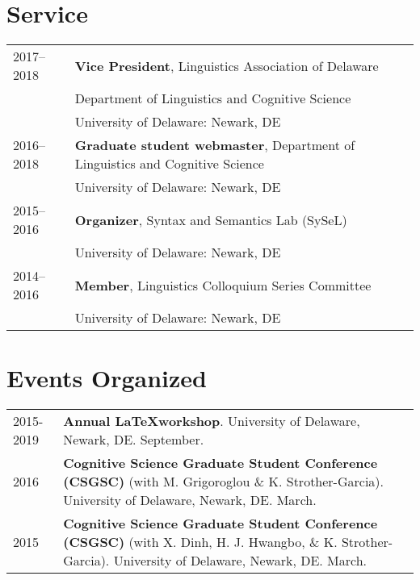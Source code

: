 \documentclass[11pt]{article} %
\begin{document}

\section*{Service}

\begin{longtable}{p{1in} p{5.3in}}
	2017--2018 & \textbf{Vice President}, Linguistics Association of Delaware \\
	& Department of Linguistics and Cognitive Science \\ 
	& University of Delaware: Newark, DE \\[5pt]
2016--2018 & \textbf{Graduate student webmaster}, Department of Linguistics and Cognitive Science \\ 
 & University of Delaware: Newark, DE \\[5pt]
2015--2016 & \textbf{Organizer}, Syntax and Semantics Lab (SySeL) \\
& University of Delaware: Newark, DE \\ [5pt]
2014--2016 & \textbf{Member}, Linguistics Colloquium Series Committee \\
& University of Delaware: Newark, DE \\ 
\end{longtable}

\section*{Events Organized}
\begin{longtable}{p{1in} p{5.3in}}
	2015-2019 & \textbf{Annual \LaTeX workshop}. University of Delaware, Newark, DE. September. \\ [5pt]
2016 &   \textbf{Cognitive Science Graduate Student Conference (CSGSC)} (with M. Grigoroglou
\& K. Strother-Garcia).  University of Delaware, Newark, DE.  March. \\ [5pt]
2015 &  \textbf{Cognitive Science Graduate Student Conference (CSGSC)} (with X. Dinh, H. J. Hwangbo, 
\& K. Strother-Garcia).  University of Delaware, Newark, DE.  March. \\ [5pt]
\end{longtable}


\end{document}
